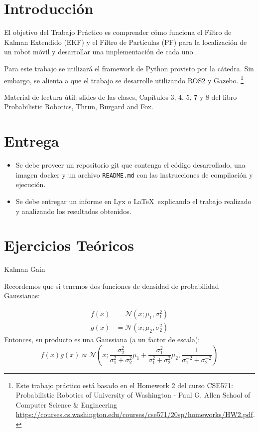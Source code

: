 \documentclass[tp]{lcc}
\begin{document}
	\maketitle
	
	
	\section{Introducción}
	
	El objetivo del Trabajo Práctico es comprender cómo funciona el Filtro de Kalman Extendido (EKF) y el Filtro de Partículas (PF) para la localización de un robot móvil y desarrollar una implementación de cada uno.
	
	Para este trabajo se utilizará el framework de Python provisto por la cátedra. Sin embargo, se alienta a que el trabajo se desarrolle utilizando ROS2 y Gazebo. \footnote{Este trabajo práctico está basado en el Homework 2 del curso CSE571: Probabilistic Robotics of University of Washington - Paul G. Allen School of Computer Science \& Engineering \url{https://courses.cs.washington.edu/courses/cse571/20sp/homeworks/HW2.pdf}.}
	
	Material de lectura útil: slides de las clases, Capítulos 3, 4, 5, 7 y 8 del libro Probabilistic Robotics, Thrun, Burgard and Fox.
	
	
	\section{Entrega}
	\begin{itemize}
		\item Se debe proveer un repositorio git que contenga el código desarrollado, una imagen docker y un archivo \lstinline{README.md} con las instrucciones de compilación y ejecución.
		
		\item Se debe entregar un informe en Lyx o \LaTeX\  explicando el trabajo realizado y analizando los resultados obtenidos.
	\end{itemize}

	
	\section{Ejercicios Teóricos}
    
    \ejercicio Kalman Gain
    
    Recordemos que si tenemos dos funciones de densidad de probabilidad Gaussianas:
    
    \begin{align*}
        f(x) &= \mathcal{N}(x;\mu_{1},\sigma_{1}^{2})\\
        g(x) &= \mathcal{N}(x;\mu_{2},\sigma_{2}^{2})
    \end{align*}
%
    Entonces, su producto es una Gaussiana (a un factor de escala):
%
    \begin{equation*}
        f(x)g(x) \propto \mathcal{N} \left(x; \dfrac{\sigma_{2}^{2}}{\sigma_{1}^{2} + \sigma_{2}^{2}}\mu_{1} + \dfrac{\sigma_{1}^{2}}{\sigma_{1}^{2} + \sigma_{2}^{2}}\mu_{2}, \dfrac{1}{\sigma_{1}^{-2} + \sigma_{2}^{-2}} \right)
    \end{equation*}
\end{document}
